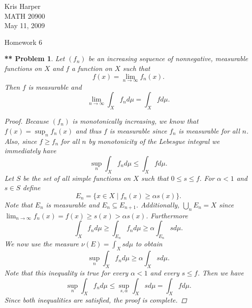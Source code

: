 \documentclass{article}
\newtheorem{**}{** Problem}
\begin{document}
\begin{flushright}
Kris Harper\\

MATH 20900\\

May 11, 2009
\end{flushright}

\begin{center}
Homework 6
\end{center}

\begin{**}
Let $(f_n)$ be an increasing sequence of nonnegative, measurable functions on $X$ and $f$ a function on $X$ such that
\[
f(x) = \lim_{n \rightarrow \infty} f_n(x).
\]
Then $f$ is measurable and
\[
\lim_{n \rightarrow \infty} \int_X f_n d\mu = \int_X f d\mu.
\]
\begin{proof}
Because $(f_n)$ is monotonically increasing, we know that $f(x) = \sup_n f_n(x)$ and thus $f$ is measurable since $f_n$ is measurable for all $n$. Also, since $f \geq f_n$ for all $n$ by monotonicity of the Lebesgue integral we immediately have
\[
\sup_n \int_X f_n d\mu \leq \int_X f d\mu.
\]
Let $S$ be the set of all simple functions on $X$ such that $0 \leq s \leq f$. For $\alpha < 1$ and $s \in S$ define
\[
E_n = \{x \in X \mid f_n(x) \geq \alpha s(x)\}.
\]
Note that $E_n$ is measurable and $E_n \subseteq E_{n+1}$. Additionally, $\bigcup_{n} E_n = X$ since $\lim_{n \rightarrow \infty} f_n(x) = f(x) \geq s(x) > \alpha s(x)$. Furthermore
\[
\int_X f_n d\mu \geq \int_{E_n} f_n d\mu \geq \alpha \int_{E_n} s d\mu.
\]
We now use the measure $\nu(E) = \int_X s d\mu$ to obtain
\[
\sup_n \int_X f_n d\mu \geq \alpha \int_X s d\mu.
\]
Note that this inequality is true for every $\alpha < 1$ and every $s \leq f$. Then we have
\[
\sup_n \int_X f_n d\mu \leq \sup_{s,\alpha} \int_X s d\mu = \int_X f d\mu.
\]
Since both inequalities are satisfied, the proof is complete.
\end{proof}
\end{**}
\end{document}
